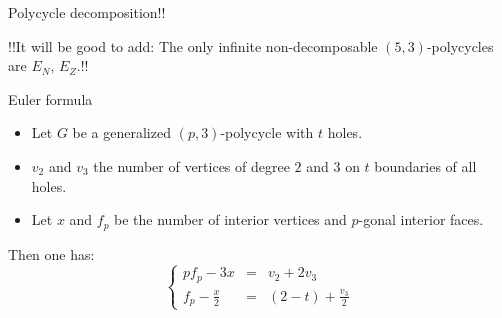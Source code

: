 \documentclass[%
pdf,
colorBG,
slideColor,
]{prosper}
\begin{document}
{\begin{slide}{Polycycle decomposition!!}
{\begin{center}
\begin{minipage}{4.7cm}
\end{minipage}
\begin{minipage}{4.7cm}
\centering
{}\par
\end{minipage}
!!It will be good to add: The only infinite non-decomposable 
$(5,3)$-polycycles
are $E_N$, $E_Z$.!!
\end{center}
}
\end{slide}
}


\begin{slide}{Euler formula}
\begin{itemize}
\item Let $G$ be a generalized $(p,3)$-polycycle with $t$ holes.
\item $v_2$ and $v_3$ the number of vertices of degree $2$ and $3$ on $t$ boundaries of all holes.
\item Let $x$ and $f_p$ be the number of interior vertices and $p$-gonal interior faces.
\end{itemize}
Then one has:
\begin{equation*}
\left\lbrace\begin{array}{rcl}
pf_p-3x         &=& v_2+2v_3\\
f_p-\frac{x}{2} &=& (2-t)+\frac{v_3}{2}
\end{array}\right.
\end{equation*}


\end{slide}
\end{document}

